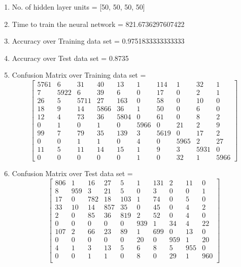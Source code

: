 \documentclass[11pt]{article}
\begin{document}
\hline
\begin{enumerate}

\item No. of hidden layer units = [50, 50, 50, 50]
\item Time to train the neural network = 821.6736297607422
\item Accuracy over Training data set = 0.9751833333333333
\item Accuracy over Test data set = 0.8735
\item Confusion Matrix over Training data set = 
\begin{equation}
  \begin{bmatrix}
5761 & 6 & 31 & 40 & 13 & 1 & 114 & 1 & 32 & 1\\
7 & 5922 & 6 & 39 & 6 & 0 & 17 & 0 & 2 & 1\\
26 & 5 & 5711 & 27 & 163 & 0 & 58 & 0 & 10 & 0\\
18 & 9 & 14 & 5866 & 36 & 1 & 50 & 0 & 6 & 0\\
12 & 4 & 73 & 36 & 5804 & 0 & 61 & 0 & 8 & 2\\
0 & 1 & 0 & 1 & 0 & 5966 & 0 & 21 & 2 & 9\\
99 & 7 & 79 & 35 & 139 & 3 & 5619 & 0 & 17 & 2\\
0 & 0 & 1 & 1 & 0 & 4 & 0 & 5965 & 2 & 27\\
11 & 5 & 11 & 14 & 15 & 1 & 9 & 3 & 5931 & 0\\
0 & 0 & 0 & 0 & 0 & 1 & 0 & 32 & 1 & 5966
  \end{bmatrix}
\end{equation}
\item Confusion Matrix over Test data set = 
\begin{equation}
  \begin{bmatrix}
806 & 1 & 16 & 27 & 5 & 1 & 131 & 2 & 11 & 0\\
8 & 959 & 3 & 21 & 5 & 0 & 3 & 0 & 0 & 1\\
17 & 0 & 782 & 18 & 103 & 1 & 74 & 0 & 5 & 0\\
33 & 10 & 14 & 857 & 35 & 0 & 45 & 0 & 4 & 2\\
2 & 0 & 85 & 36 & 819 & 2 & 52 & 0 & 4 & 0\\
0 & 0 & 0 & 0 & 0 & 939 & 1 & 34 & 4 & 22\\
107 & 2 & 66 & 23 & 89 & 1 & 699 & 0 & 13 & 0\\
0 & 0 & 0 & 0 & 0 & 20 & 0 & 959 & 1 & 20\\
4 & 1 & 3 & 13 & 5 & 6 & 8 & 5 & 955 & 0\\
0 & 0 & 1 & 1 & 0 & 8 & 0 & 29 & 1 & 960\\
  \end{bmatrix}
\end{equation}
\end{enumerate}
\end{document}
